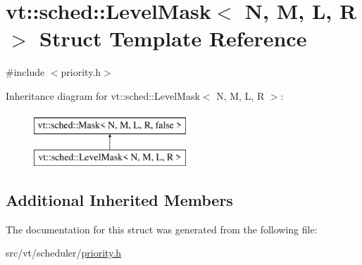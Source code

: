 \hypertarget{structvt_1_1sched_1_1_level_mask}{}\section{vt\+:\+:sched\+:\+:Level\+Mask$<$ N, M, L, R $>$ Struct Template Reference}
\label{structvt_1_1sched_1_1_level_mask}


{\ttfamily \#include $<$priority.\+h$>$}

Inheritance diagram for vt\+:\+:sched\+:\+:Level\+Mask$<$ N, M, L, R $>$\+:\begin{figure}[H]
\begin{center}
\leavevmode
\includegraphics[height=2.000000cm]{structvt_1_1sched_1_1_level_mask}
\end{center}
\end{figure}
\subsection*{Additional Inherited Members}


The documentation for this struct was generated from the following file\+:\begin{DoxyCompactItemize}
\item 
src/vt/scheduler/\hyperlink{priority_8h}{priority.\+h}\end{DoxyCompactItemize}
